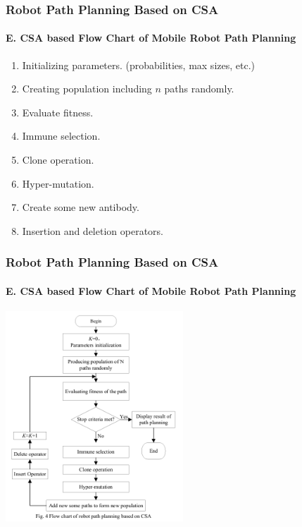 \frame
{
\frametitle{Robot Path Planning Based on CSA}
\framesubtitle{E. CSA based Flow Chart of Mobile Robot Path Planning}
\begin{enumerate}
	\item Initializing parameters. (probabilities, max sizes, etc.)
	\item Creating population including $n$ paths randomly.
	\item Evaluate fitness.
	\item Immune selection.
	\item Clone operation.
	\item Hyper-mutation.
	\item Create some new antibody.
	\item Insertion and deletion operators.
\end{enumerate}
}

\frame
{
\frametitle{Robot Path Planning Based on CSA}
\framesubtitle{E. CSA based Flow Chart of Mobile Robot Path Planning}
\begin{center}
	\includegraphics[width=0.5\textwidth]{img/diagram2}
\end{center}
}
